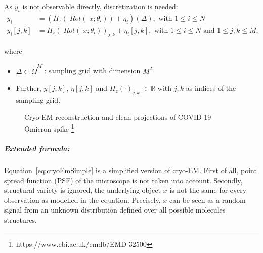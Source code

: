 As $y_i$ is not observable directly, discretization is needed:
\begin{equation}
    \label{eq:cryoEmSimpleDiscrete}
    \begin{aligned}
        y_i &= \left( \Pi_z (\; Rot (\;x; \theta_i)) + \eta_i\right)(\Delta), \text{ with } 1 \leq i \leq N \\
        y_i[j,k] &= \Pi_z (\; Rot(\;x; \theta_i))_{j,k} + \eta_i[j,k], \text{ with } 1 \leq i \leq N \text{ and } 1 \leq j,k \leq M,
    \end{aligned}
\end{equation}

where 
\begin{itemize}
    \item $\Delta \subset \tilde{\Omega}^{M^2}$: sampling grid with dimension $M^2$
    \item Further, $y[j,k]$, $\eta[j,k]$ and $\Pi_z(\cdot)_{j,k}$ $ \in \mathbb{R}$ with $j,k$ as indices of the sampling grid.
\end{itemize}


\begin{figure}[H]
    \label{fig:cryo-em-omicron}
    \hfill
    \hfill
    \hfill
    \hfill
    \hfill
	\caption{Cryo-EM reconstruction and clean projections of COVID-19 Omicron spike \protect\footnote{https://www.ebi.ac.uk/emdb/EMD-32500}}
\end{figure}


\subparagraph{Extended formula:} 
Equation~\ref{eq:cryoEmSimple} is a simplified version of cryo-EM.
First of all, point spread function (PSF) of the microscope is not taken into account.
Secondly, structural variety is ignored, the underlying object $x$ is not the same 
for every observation as modelled in the equation. 
Precisely, $x$ can be seen as a random signal from an unknown distribution defined over all possible molecules structures.

